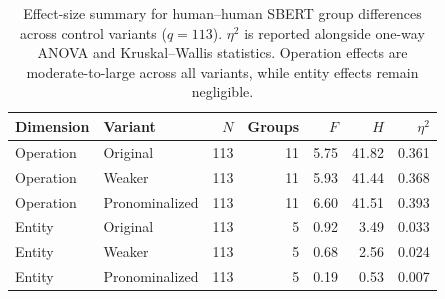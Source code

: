 \begin{table}[t]
\centering
\caption{Effect-size summary for human--human SBERT group differences across control variants ($q{=}113$). $\eta^2$ is reported alongside one-way ANOVA and Kruskal--Wallis statistics. Operation effects are moderate-to-large across all variants, while entity effects remain negligible.}
\label{tab:human_hh_effect_sizes}
\small
\begin{tabular}{llrrrrr}
\toprule
Dimension & Variant & $N$ & Groups & $F$ & $H$ & $\eta^2$ \\
\midrule
Operation & Original & 113 & 11 & 5.75 & 41.82 & 0.361 \\
Operation & Weaker & 113 & 11 & 5.93 & 41.44 & 0.368 \\
Operation & Pronominalized & 113 & 11 & 6.60 & 41.51 & 0.393 \\
Entity & Original & 113 & 5 & 0.92 & 3.49 & 0.033 \\
Entity & Weaker & 113 & 5 & 0.68 & 2.56 & 0.024 \\
Entity & Pronominalized & 113 & 5 & 0.19 & 0.53 & 0.007 \\
\bottomrule
\end{tabular}
\end{table}
